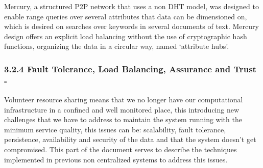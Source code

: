 Mercury\cite{Bharambe}, a structured P2P network that uses a non DHT model, was designed to enable range queries over several attributes that data can be dimensioned on, which is desired on searches over keywords in several documents of text. Mercury design offers an explicit load balancing without the use of cryptographic hash functions, organizing the data in a circular way, named `attribute hubs'.








\subsubsection{3.2.4 Fault Tolerance, Load Balancing, Assurance and Trust -}

Volunteer resource sharing means that we no longer have our computational infrastructure in a confined and well monitored place, this introducing new challenges that we have to address \cite{Koloniari2005} to maintain the system running with the minimum service quality, this issues can be: scalability, fault tolerance, persistence, availability and security\cite{Wallach} of the data and that the system doesn't get compromised. This part of the document serves to describe the techniques implemented in previous non centralized systems to address this issues.

